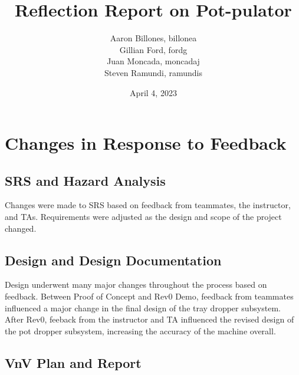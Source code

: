 \documentclass{article}
\title{Reflection Report on Pot-pulator}
\author{Aaron Billones, billonea\\Gillian Ford, fordg\\Juan Moncada, moncadaj\\Steven Ramundi, ramundis}
\date{April 4, 2023}
\begin{document}
\maketitle


\section{Changes in Response to Feedback}



\subsection{SRS and Hazard Analysis}

Changes were made to SRS based on feedback from teammates, the instructor, and TAs. 
Requirements were adjusted as the design and scope of the project changed.

\subsection{Design and Design Documentation}

Design underwent many major changes throughout the process based on feedback. Between Proof of Concept 
and Rev0 Demo, feedback from teammates influenced a major change in the final design of the tray dropper 
subsystem. After Rev0, feeback from the instructor and TA influenced the revised design of the pot dropper 
subsystem, increasing the accuracy of the machine overall.

\subsection{VnV Plan and Report}
\end{document}
